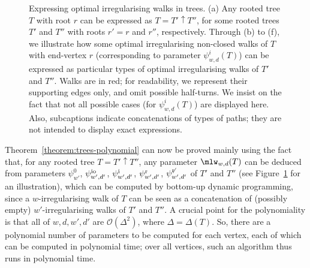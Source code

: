\documentclass[a4paper,11pt,dvipsnames]{elsarticle}
\newcommand{\sam}[1]{\todo[size=\tiny,color=red!20!white]{\textbf{Sam:} #1}}
\newcommand{\sam}[1]{}
\begin{document}
\begin{figure}[!t]
{{
    }
    }
    
\caption{Expressing optimal irregularising walks in trees.
(a) Any rooted tree $T$ with root $r$ can be expressed as $T=T'\uparrow T''$, for some rooted trees $T'$ and $T''$ with roots $r'=r$ and $r''$, respectively.
Through (b) to (f), we illustrate how some optimal irregularising non-closed walks of $T$ with end-vertex $r$ (corresponding to parameter $\psi^i_{w,d}(T)$)
can be expressed as particular types of optimal irregularising walks of $T'$ and $T''$.
Walks are in red; for readability, we represent their supporting edges only, and omit possible half-turns.
We insist on the fact that not all possible cases (for $\psi^i_{w,d}(T)$) are displayed here. Also, subcaptions indicate concatenations of types of paths; they are not intended to display exact expressions.
\label{figure:trees}}
\end{figure}


Theorem~\ref{theorem:trees-polynomial} can now be proved mainly using the fact that, for any rooted tree $T=T' \uparrow T''$, any parameter $\mlw_{w,d}(T)$ can be deduced from parameters $\psi^0_{w'}$, $\psi^{\rm io}_{w',d'}$, $\psi^{\rm i}_{w',d'}$, $\psi^{\rm r}_{w',d'}$, $\psi^{\not{\rm r}}_{w',d'}$ of $T'$ and $T''$ (see Figure~\ref{figure:trees} for an illustration), which can be computed by bottom-up dynamic programming, since a $w$-irregularising walk of $T$ can be seen as a concatenation of (possibly empty) $w'$-irregularising walks of $T'$ and $T''$. 
A crucial point for the polynomiality is that all of $w,d,w',d'$ are $\mathcal{O}(\Delta^2)$, where $\Delta=\Delta(T)$. So, there are a polynomial number of parameters to be computed for each vertex, each of which can be computed in polynomial time; over all vertices, such an algorithm thus runs in polynomial time.
\end{document}
